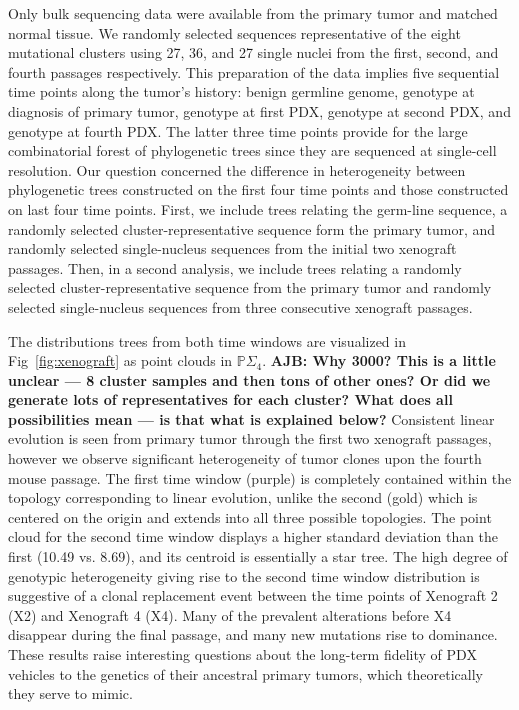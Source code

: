 \documentclass[a4paper,11pt]{article}
\begin{document}
Only bulk sequencing data were available from the primary tumor and matched normal tissue.
We randomly selected sequences representative of the eight mutational clusters using 27, 36, and 27 single nuclei from the first, second, and fourth passages respectively.
This preparation of the data implies five sequential time points along the tumor's history: benign germline genome, genotype at diagnosis of primary tumor, genotype at first PDX, genotype at second PDX, and genotype at fourth PDX.
The latter three time points provide for the large combinatorial forest of phylogenetic trees since they are sequenced at single-cell resolution.
Our question concerned the difference in heterogeneity between phylogenetic trees constructed on the first four time points and those constructed on last four time points.
First, we include trees relating the germ-line sequence, a randomly selected cluster-representative sequence form the primary tumor, and randomly selected single-nucleus sequences from the initial two xenograft passages.
Then, in a second analysis, we include trees relating a randomly selected cluster-representative sequence from the primary tumor and randomly selected single-nucleus sequences from three consecutive xenograft passages.

The distributions trees from both time windows are visualized in Fig~\ref{fig:xenograft} as point clouds in $\mathbb{P}\Sigma_4 $.
{\bf AJB: Why 3000?  This is a little unclear --- 8 cluster samples and then tons of other ones?  Or did we generate lots of representatives for each cluster?  What does all possibilities mean --- is that what is explained below?}
Consistent linear evolution is seen from primary tumor through the first two xenograft passages, however we observe significant heterogeneity of tumor clones upon the fourth mouse passage.
The first time window (purple) is completely contained within the topology corresponding to linear evolution, unlike the second (gold) which is centered on the origin and extends into all three possible topologies.
The point cloud for the second time window displays a higher standard deviation than the first (10.49 vs. 8.69), and its centroid is essentially a star tree.
The high degree of genotypic heterogeneity giving rise to the second time window distribution is suggestive of a clonal replacement event between the time points of Xenograft 2 (X2) and Xenograft 4 (X4).
Many of the prevalent alterations before X4 disappear during the final passage, and many new mutations rise to dominance.
These results raise interesting questions about the long-term fidelity of PDX vehicles to the genetics of their ancestral primary tumors, which theoretically they serve to mimic.
\end{document}
